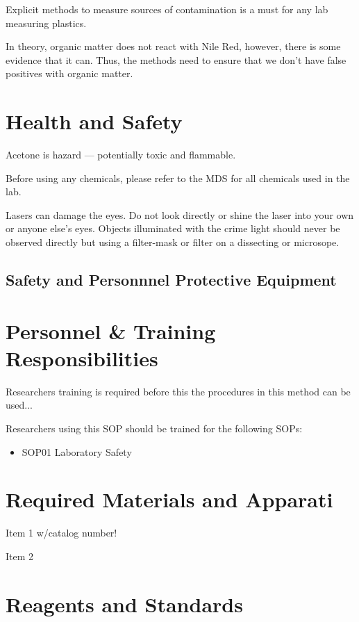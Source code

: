 \documentclass[12pt]{../SOP4_alpha}\usepackage[]{graphicx}\usepackage[]{color}
\begin{document}
\NP Explicit methods to measure sources of contamination is a must for any lab measuring plastics. 

\NP In theory, organic matter does not react with Nile Red, however, there is some evidence that it can. Thus, the methods need to ensure that we don't have false positives with organic matter. 

\section{Health and Safety}

\NP Acetone is hazard --- potentially toxic and flammable. 

\NP Before using any chemicals, please refer to the MDS for all chemicals used in the lab. 

\NP Lasers can damage the eyes. Do not look directly or shine the laser into your own or anyone else's eyes. Objects illuminated with the crime light should never be observed directly but using a filter-mask or filter on a dissecting or microsope. 

\subsection{Safety and Personnnel Protective Equipment}

\section{Personnel \& Training Responsibilities}

\NP Researchers training is required before this the procedures in this method can be used... 

\NP Researchers using this SOP should be trained for the following SOPs:

\begin{itemize}
  \item SOP01 Laboratory Safety
\end{itemize}

\section{Required Materials and Apparati}

\NP Item 1 w/catalog number!

\NP Item 2

\section{Reagents and Standards}
\end{document}
